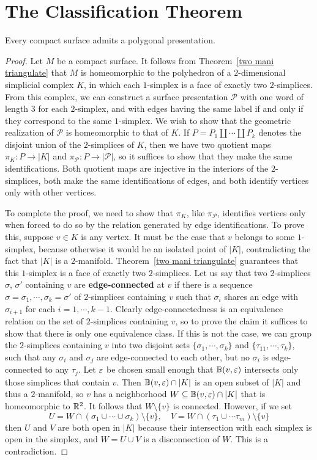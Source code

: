 \section{The Classification Theorem}
\begin{proposition}
Every compact surface admits a polygonal presentation.
\end{proposition}
\begin{proof}
Let $M$ be a compact surface. It follows from Theorem~\ref{two mani triangulate} that $M$ is homeomorphic to the polyhedron of a $2$-dimensional simplicial complex $K$, in which each $1$-simplex is a face of exactly two $2$-simplices. From this complex, we can construct a surface presentation $\mathcal{P}$ with one word of length $3$ for each $2$-simplex, and with edges having the same label if and only if they correspond to the same $1$-simplex. We wish to show that the geometric realization of $\mathcal{P}$ is homeomorphic to that of $K$. If $P=P_1\amalg\cdots\amalg P_k$ denotes the disjoint union of the $2$-simplices of $K$, then we have two quotient maps $\pi_K:P\to|K|$ and $\pi_\mathcal{P}:P\to|\mathcal{P}|$, so it suffices to show that they make the same identifications. Both quotient maps are injective in the interiors of the $2$-simplices, both make the same identifications of edges, and both identify vertices only with other vertices.\par
To complete the proof, we need to show that $\pi_K$, like $\pi_\mathcal{P}$, identifies vertices only when forced to do so by the relation generated by edge identifications. To prove this, suppose $v\in K$ is any vertex. It must be the case that $v$ belongs to some $1$-simplex, because otherwise it would be an isolated point of $|K|$, contradicting the fact that $|K|$ is a $2$-manifold. Theorem~\ref{two mani triangulate} guarantees that this $1$-simplex is a face of exactly two $2$-simplices. Let us say that two $2$-simplices $\sigma$, $\sigma'$ containing $v$ are \textbf{edge-connected} at $v$ if there is a sequence $\sigma=\sigma_1,\cdots,\sigma_k=\sigma'$ of $2$-simplices containing $v$ such that $\sigma_i$ shares an edge with $\sigma_{i+1}$ for each $i=1,\cdots,k-1$. Clearly edge-connectedness is an equivalence relation on the set of $2$-simplices containing $v$, so to prove the claim it suffices to show that there is only one equivalence class. If this is not the case, we can group the $2$-simplices containing $v$ into two disjoint sets $\{\sigma_1,\cdots,\sigma_k\}$ and $\{\tau_11,\cdots,\tau_k\}$, such that any $\sigma_i$ and $\sigma_j$ are edge-connected to each other, but no $\sigma_i$ is edge-connected to any $\tau_j$. Let $\varepsilon$ be chosen small enough that $\mathbb{B}(v,\varepsilon)$ intersects only those simplices that contain $v$. Then $\mathbb{B}(v,\varepsilon)\cap|K|$ is an open subset of $|K|$ and thus a $2$-manifold, so $v$ has a neighborhood $W\subseteq\mathbb{B}(v,\varepsilon)\cap|K|$ that is homeomorphic to $\mathbb{R}^2$. It follows that $W\setminus\{v\}$ is connected. However, if we set
\[U=W\cap(\sigma_1\cup\cdots\cup\sigma_k)\setminus\{v\},\quad V=W\cap(\tau_1\cup\cdots\tau_m)\setminus\{v\}\]
then $U$ and $V$ are both open in $|K|$ because their intersection with each simplex is open in the simplex, and $W=U\cup V$ is a disconnection of $W$. This is a contradiction.
\end{proof}
